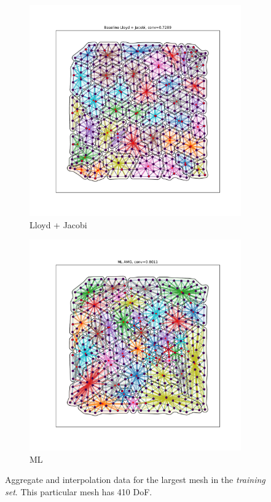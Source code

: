 \documentclass{article}
\begin{document}
\begin{figure}[h]
  \centering
  \begin{subfigure}[t]{0.49\textwidth}
    \centering
    \includegraphics[width=\textwidth, trim=80 70 70 50, clip]{grid_largest_lloyd.pdf}
    \caption{Lloyd + Jacobi}
  \end{subfigure}
  \begin{subfigure}[t]{0.49\textwidth}
    \centering
    \includegraphics[width=\textwidth, trim=80 70 70 50, clip]{grid_largest_ml.pdf}
    \caption{ML}
  \end{subfigure}
  \caption{Aggregate and interpolation data for the largest mesh in the \textit{training set}.  This particular mesh has 410 DoF.}
  \label{fig:grid800}
\end{figure}
\end{document}
